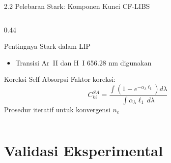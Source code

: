 \documentclass[aspectratio=169, 10pt]{beamer}
\begin{document}
\begin{frame}{2.2 Pelebaran Stark: Komponen Kunci CF-LIBS}
\begin{columns}[T]
\begin{column}{0.44\textwidth}
\begin{exampleblock}{Pentingnya Stark dalam LIP}
\begin{itemize}
          \item Transisi Ar~II dan H~I 656.28 nm digunakan
        \end{itemize}
      \end{exampleblock}
      \vspace{4pt}
      \begin{alertblock}{Koreksi Self-Absorpsi}
        \footnotesize
        Faktor koreksi:
        \begin{equation}
          C_{ki}^{SA} = \frac{\int(1-e^{-\alpha_\lambda \ell_1})d\lambda}{\int \alpha_\lambda \ell_1\, d\lambda}
        \end{equation}
        Prosedur iteratif untuk konvergensi $n_e$
      \end{alertblock}
    \end{column}
  \end{columns}
\end{frame}

\section{Validasi Eksperimental}
\end{document}
